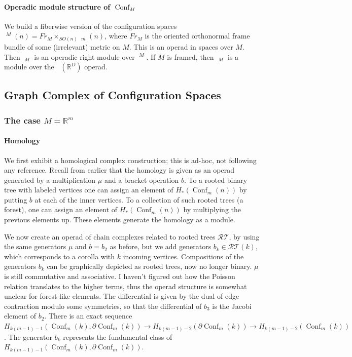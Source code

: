 \documentclass{scrartcl}
\theoremstyle{plain}
\theoremstyle{definition}
\newcommand{\R}{\mathbb R}
\DeclareMathOperator{\Conf}{Conf}
\DeclareMathOperator{\cConf}{\overline{Conf}}
\begin{document}
\paragraph{Operadic module structure of $\Conf_M$} We build a fiberwise version of the configuration spaces $\cConf^M(n) = Fr_M\times_{SO(n)} \cConf_m(n)$, where $Fr_M$ is the oriented orthonormal frame bundle of some (irrelevant) metric on $M$. This is an operad in spaces over $M$. Then $\cConf_M$ is an operadic right module over $\cConf^M$. If $M$ is framed, then $\cConf_M$ is a module over the $\cConf(\R^D)$ operad.






\subsection{Graph Complex of Configuration Spaces}

\subsubsection{The case $M=\R^m$}

\paragraph{Homology} We first exhibit a homological complex construction; this is ad-hoc, not following any reference. Recall from earlier that the homology is given as an operad generated by a multiplication $\mu$ and a bracket operation $b$. To a rooted binary tree with labeled vertices one can assign an element of $H_*(\Conf_m(n))$ by putting $b$ at each of the inner vertices. To a collection of such rooted trees (a forest), one can assign an element of $H_*(\Conf_m(n))$ by multiplying the previous elements up. These elements generate the homology as a module. 

We now create an operad of chain complexes related to rooted trees $\mathcal{RT}$, by using the same generators $\mu$ and $b=b_2$ as before, but we add generators $b_k\in\mathcal{RT}(k)$, which corresponds to a corolla with $k$ incoming vertices. Compositions of the generators $b_k$ can be graphically depicted as rooted trees, now no longer binary. $\mu$ is still commutative and associative. I haven't figured out how the Poisson relation translates to the higher terms, thus the operad structure is somewhat unclear for forest-like elements. The differential is given by the dual of edge contraction modulo some symmetries, so that the differential of $b_3$ is the Jacobi element of $b_2$. There is an exact sequence $H_{k(m-1)-1}(\Conf_m(k), \partial\Conf_m(k)) \to H_{k(m-1)-2}(\partial\Conf_m(k)) \to H_{k(m-1)-2}(\Conf_m(k))$. The generator $b_k$ represents the fundamental class of $H_{k(m-1)-1}(\Conf_m(k), \partial\Conf_m(k))$.
\end{document}
